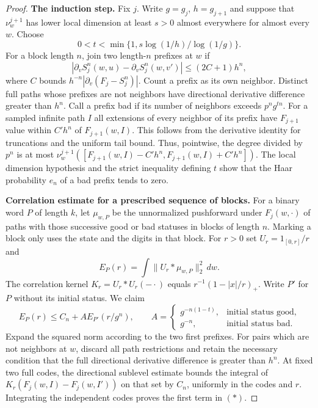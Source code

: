 \documentclass[11pt,a4paper]{article}
\begin{document}
\begin{proof}
\par\smallskip\noindent\textbf{The induction step.}\enspace
Fix $j$. Write $g=g_j$, $h=g_{j+1}$ and suppose that $\nu^{j+1}_w$ has
lower local dimension at least $s>0$ almost everywhere for almost every
$w$. Choose
\[
       0<t<\min\{1,s\log(1/h)/\log(1/g)\}.
\]
For a block length $n$, join two length-$n$ prefixes at $w$ if
\[
   |\partial_v S_j^n(w,u)-\partial_v S_j^n(w,v')|
                     \le (2C+1)h^n ,
\]
where $C$ bounds $h^{-n}|\partial_v(F_j-S_j^n)|$. Count a prefix
as its own neighbor. Distinct full paths whose prefixes are not
neighbors have directional derivative difference greater than $h^n$.
Call a prefix bad if its number of neighbors exceeds $p^n g^{tn}$.
For a sampled infinite path $I$ all extensions of every neighbor
of its prefix have $F_{j+1}$ value within $C' h^n$ of
$F_{j+1}(w,I)$. This follows from the derivative identity for
truncations and the uniform tail bound. Thus, pointwise, the degree
divided by $p^n$ is at most
$\nu^{j+1}_w([F_{j+1}(w,I)-C'h^n,F_{j+1}(w,I)+C'h^n])$.
The local dimension hypothesis and the strict inequality defining $t$
show that the Haar probability $e_n$ of a bad prefix tends to zero.

\par\smallskip\noindent\textbf{Correlation estimate for a prescribed sequence of blocks.}\enspace
For a binary word $P$ of length $k$, let $\mu_{w,P}$ be the
unnormalized pushforward under $F_j(w,\cdot)$ of paths with those
successive good or bad statuses in blocks of length $n$. Marking a
block only uses the state and the digits in that block. For $r>0$ set
$U_r=\mathrm{1}_{[0,r]}/r$ and
\[
       E_P(r)=\int\|U_r*\mu_{w,P}\|_2^2\,dw .
\]
The correlation kernel $K_r=U_r*U_r(-\cdot)$ equals
$r^{-1}(1-|x|/r)_+$. Write $P'$ for $P$ without its initial status.
We claim
\[
 E_P(r)\le C_n+A E_{P'}(r/g^n),\qquad
 A=\begin{cases}g^{-n(1-t)},&\text{initial status good},\\
                  g^{-n},&\text{initial status bad}.
    \end{cases}                                                     \tag{*}
\]
Expand the squared norm according to the two first prefixes. For
pairs which are not neighbors at $w$, discard all path restrictions
and retain the necessary condition that the full directional
derivative difference is greater than $h^n$. At fixed two full
codes, the directional sublevel estimate bounds the integral of
$K_r(F_j(w,I)-F_j(w,I'))$ on that set by $C_n$, uniformly in the
codes and $r$. Integrating the independent codes proves the first
term in $(*)$.


\end{proof}
\end{document}
